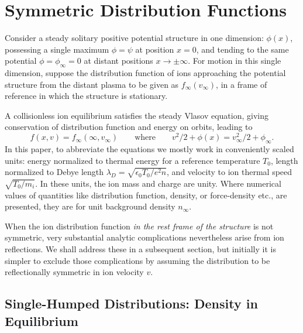 \documentclass[12pt]{article}
\begin{document}
\section{Symmetric Distribution Functions}\label{sec1}


Consider a steady solitary positive potential structure in one
dimension: $\phi(x)$, possessing a single maximum $\phi=\psi$ at
position $x=0$, and tending to the same potential $\phi=\phi_\infty=0$
at distant positions $x\to \pm \infty$. For motion in this single
dimension, suppose the distribution function of ions approaching the
potential structure from the distant plasma to be given as
$f_\infty(v_\infty)$, in a frame of reference in which the structure
is stationary.

 A collisionless ion equilibrium
satisfies the steady Vlasov equation, giving conservation of
distribution function and energy on orbits, leading to
\begin{equation}
  f(x,v)=f_\infty(\infty,v_\infty) \qquad\mbox{where}\qquad 
  v^2/2+\phi(x) = v_\infty^2/2+\phi_\infty. 
\end{equation}
In this paper, to abbreviate the equations we mostly work in
conveniently scaled units: energy normalized to thermal energy for a
reference temperature $T_0$, length normalized to Debye length
$\lambda_D=\sqrt{\epsilon_0 T_0/e^2n}$, and velocity to ion thermal
speed $\sqrt{T_0/m_i}$. In these units, the ion mass and charge are
unity. Where numerical values of quantities like distribution
function, density, or force-density etc., are presented, they are for
unit background density $n_\infty$.

When the ion distribution function \emph{in the rest frame of the
  structure} is not symmetric, very substantial analytic complications
nevertheless arise from ion reflections. We shall address these in a
subsequent section, but initially it is simpler to exclude those
complications by assuming the distribution to be reflectionally
symmetric in ion velocity $v$.
\subsection{Single-Humped Distributions: Density in Equilibrium}
\end{document}
